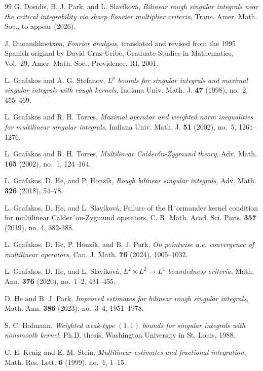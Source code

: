 \documentclass[11pt]{amsart}
\begin{document}
\begin{thebibliography}{99}
	G. Dosidis, B. J. Park, and L. Slav\'ikov\'a,
	{\it Bilinear rough singular integrals near the critical integrability via sharp Fourier multiplier criteria},
	Trans. Amer. Math. Soc., to appear (2026).
	
	J. Duoandikoetxea,
	{\it Fourier analysis},
	translated and revised from the 1995 Spanish original by David Cruz-Uribe,
	Graduate Studies in Mathematics, Vol.~29, Amer. Math. Soc., Providence, RI, 2001.
	
	L. Grafakos and A. G. Stefanov,
	{\it $L^p$ bounds for singular integrals and maximal singular integrals with rough kernels},
	Indiana Univ. Math. J. \textbf{47} (1998), no.~2, 455--469.
	
	L. Grafakos and R. H. Torres,
	{\it Maximal operator and weighted norm inequalities for multilinear singular integrals},
	Indiana Univ. Math. J. \textbf{51} (2002), no.~5, 1261--1276.
	
	L. Grafakos and R. H. Torres,
	{\it Multilinear Calder\'on-Zygmund theory},
	Adv. Math. \textbf{165} (2002), no.~1, 124--164.
	
	L. Grafakos, D. He, and P. Honz\'ik,
	{\it Rough bilinear singular integrals},
	Adv. Math. \textbf{326} (2018), 54--78.

		L. Grafakos, D. He, and L. Slav\'ikov\'a, Failure of the H¨ormander kernel condition for multilinear
	Calder´on-Zygmund operators, C. R. Math. Acad. Sci. Paris. \textbf {357} (2019), no. 4, 382-388.
	
	L. Grafakos, D. He, P. Honz\'ik, and B. J. Park,
	{\it On pointwise a.e. convergence of multilinear operators},
	Can. J. Math. \textbf{76} (2024), 1005--1032.
	
	L. Grafakos, D. He, and L. Slav\'ikov\'a,
	{\it $L^2\times L^2\to L^1$ boundedness criteria},
	Math. Ann. \textbf{376} (2020), no.~1--2, 431--455.
	
	D. He and B. J. Park,
	{\it Improved estimates for bilinear rough singular integrals},
	Math. Ann. \textbf{386} (2023), no.~3--4, 1951--1978.
	
	S. C. Hofmann,
	{\it Weighted weak-type $(1,1)$ bounds for singular integrals with nonsmooth kernel},
	Ph.D. thesis, Washington University in St. Louis, 1988.
	
	C. E. Kenig and E. M. Stein,
	{\it Multilinear estimates and fractional integration},
	Math. Res. Lett. \textbf{6} (1999), no.~1, 1--15.
	

\end{thebibliography}
\end{document}
